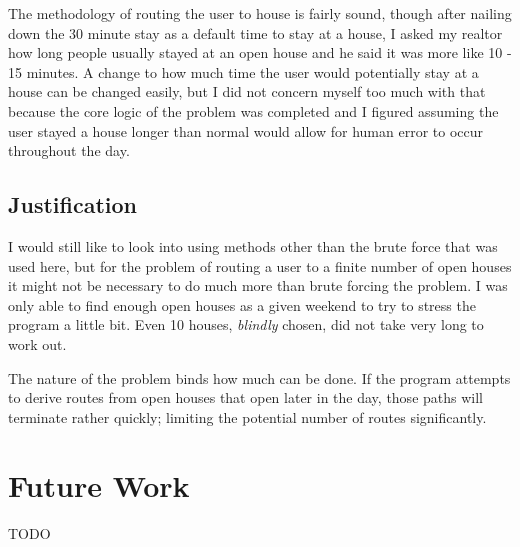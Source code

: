 \documentclass[letterpaper,11pt]{report}
\theoremstyle{definition}
\theoremstyle{definition}
\begin{document}
The methodology of routing the user to house is fairly sound, though after nailing down the 30 minute stay as a default time to stay at a house, I asked my realtor how long people usually stayed at an open house and he said it was more like 10 - 15 minutes. A change to how much time the user would potentially stay at a house can be changed easily, but I did not concern myself too much with that because the core logic of the problem was completed and I figured assuming the user stayed a house longer than normal would allow for human error to occur throughout the day.

\subsection{Justification}
I would still like to look into using methods other than the brute force that was used here, but for the problem of routing a user to a finite number of open houses it might not be necessary to do much more than brute forcing the problem. I was only able to find enough open houses as a given weekend to try to stress the program a little bit. Even 10 houses, \emph{blindly} chosen, did not take very long to work out. 

The nature of the problem binds how much can be done. If the program attempts to derive routes from open houses that open later in the day, those paths will terminate rather quickly; limiting the potential number of routes significantly.

\section{Future Work}
TODO






\end{document}
